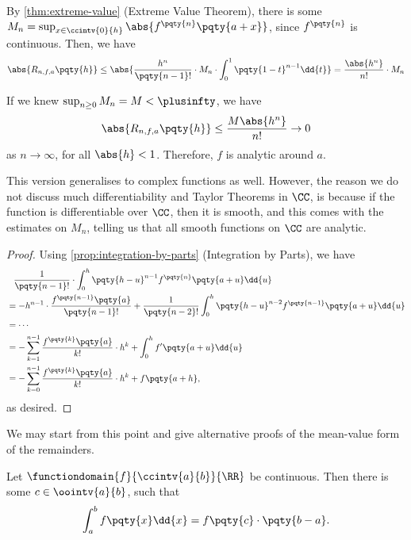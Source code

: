 \begin{remark}
    By \autoref{thm:extreme-value} (Extreme Value Theorem), there is some \(M_n = \sup_{x \in \ccintv{0}{h}} \abs{f^{\pqty{n}} \pqty{a + x}}\), since \(f^{\pqty{n}}\) is continuous. Then, we have
    \[
        \abs{R_{n, f, a} \pqty{h}} \leq \abs{\frac{h^n}{\pqty{n - 1}!} \cdot M_n \cdot \int_{0}^{1} \pqty{1 - t}^{n - 1} \dd{t}} = \frac{\abs{h^n}}{n!} \cdot M_n
    \]

    If we knew \(\sup_{n \geq 0} M_n = M < \plusinfty\), we have
    \[
        \abs{R_{n, f, a} \pqty{h}} \leq \frac{M \abs{h^n}}{n!} \to 0
    \]
    as \(n \to \infty\), for all \(\abs{h} < 1\). Therefore, \(f\) is analytic around \(a\).
\end{remark}

\begin{remark}
    This version generalises to complex functions as well. However, the reason we do not discuss much differentiability and Taylor Theorems in \(
    \CC\), is because if the function is differentiable over \(\CC\), then it is smooth, and this comes with the estimates on \(M_n\), telling us that all smooth functions on \(\CC\) are analytic.
\end{remark}

\begin{proof}
    Using \autoref{prop:integration-by-parts} (Integration by Parts), we have
    \begin{align*}
        &\phantom{=} \frac{1}{\pqty{n - 1}!} \cdot \int_{0}^{h} \pqty{h - u}^{n - 1} f^{\pqty{n}} \pqty{a + u} \dd{u} \\
        &= - h^{n - 1} \cdot \frac{f^{\pqty{n - 1}} \pqty{a}}{\pqty{n - 1}!} + \frac{1}{\pqty{n - 2}!} \int_{0}^{h} \pqty{h - u}^{n - 2} f^{\pqty{n - 1}} \pqty{a + u} \dd{u} \\
        &= \cdots \\
        &= - \sum_{k = 1}^{n - 1} \frac{f^{\pqty{k}} \pqty{a}}{k!} \cdot h^k + \int_{0}^{h} f'\pqty{a + u} \dd{u} \\
        &= - \sum_{k = 0}^{n - 1} \frac{f^{\pqty{k}} \pqty{a}}{k!} \cdot h^k + f\pqty{a + h},
    \end{align*}
    as desired.
\end{proof}

We may start from this point and give alternative proofs of the mean-value form of the remainders.

\begin{theorem}
    \label{thm:mvt-integrals}%
    Let \(\functiondomain{f}{\ccintv{a}{b}}{\RR}\) be continuous. Then there is some \(c \in \oointv{a}{b}\), such that
    \[
        \int_{a}^{b} f\pqty{x} \dd{x} = f\pqty{c} \cdot \pqty{b - a}.
    \]
\end{theorem}

